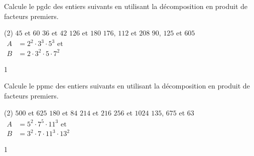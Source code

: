 \documentclass[a4paper,11pt]{report}
\begin{document}






\begin{exo}{
    Calcule le pgdc des entiers suivants en utilisant la décomposition en produit de facteurs premiers.

    \begin{tasks}(2)
    \task $45$ et $60$
    \task $36$ et $42$
    \task $126$ et $180$
    \task $176$, $112$ et $208$
    \task $90$, $125$ et $605$
    \task $\begin{aligned}
		    A&=2^2\cdot3^3\cdot5^3 \text{ et}\\
		    B&= 2\cdot3^2\cdot5\cdot7^2
	\end{aligned}$
\end{tasks}
}{1}\end{exo}


\begin{exo}{
Calcule le ppmc des entiers suivants en utilisant la décomposition en produit de facteurs premiers.



\begin{tasks}(2)
    \task $500$ et $625$
    \task $180$ et $84$
    \task $214$ et $216$
    \task $256$ et $1024$
    \task $135$, $675$ et $63$
    \task $\begin{aligned}A &= 5^2\cdot7^5\cdot11^3 \text{ et}\\ B&= 3^2\cdot7\cdot11^3\cdot13^2
	    \end{aligned}$
\end{tasks}
}{1}\end{exo}


\begin{FLP}{11}{1}
\end{FLP}
\end{document}

